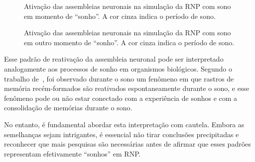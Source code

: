\begin{figure}[!ht]
\caption{Ativação das assembleias neuronais na simulação da RNP com sono em momento de ``sonho''. A cor cinza indica o período de sono.}
\end{figure}

\begin{figure}[!ht]
\caption{Ativação das assembleias neuronais na simulação da RNP com sono em outro momento de ``sonho''. A cor cinza indica o período de sono.}
\end{figure}

Esse padrão de reativação da assembleia neuronal pode ser interpretado analogamente aos processos de sonho em organismos
biológicos. Segundo o trabalho de~, foi observado durante o sono um fenômeno em que rastros
de memória recém-formados são reativados espontaneamente durante o sono, e esse fenômeno pode ou não estar conectado com a experiência de
sonhos e com a consolidação de memórias durante o sono.

No entanto, é fundamental abordar esta interpretação com cautela. Embora as semelhanças sejam intrigantes, é essencial
não tirar conclusões precipitadas e reconhecer que mais pesquisas são necessárias antes de afirmar que esses padrões representam
efetivamente ``sonhos'' em RNP.\@
